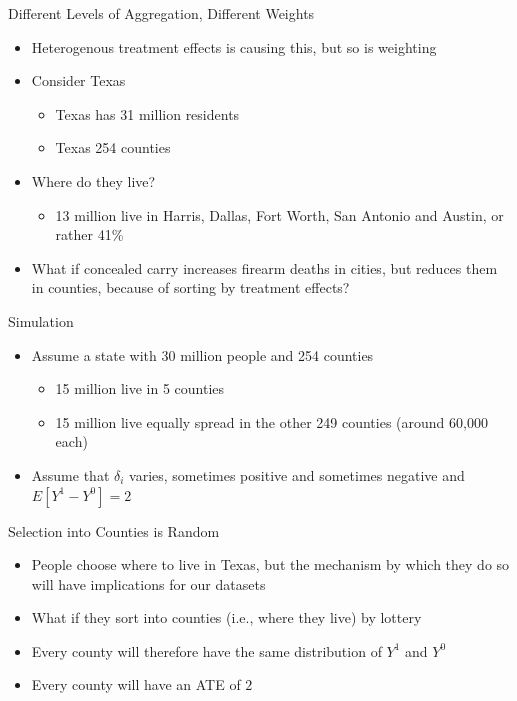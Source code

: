 \documentclass{beamer}
\begin{document}
\begin{frame}{Different Levels of Aggregation, Different Weights}


\begin{itemize}
\item Heterogenous treatment effects is causing this, but so is weighting
\item Consider Texas
	\begin{itemize}
	\item Texas has 31 million residents
	\item Texas 254 counties
	\end{itemize}
\item Where do they live?
	\begin{itemize}
	\item 13 million live in Harris, Dallas, Fort Worth, San Antonio and Austin, or rather 41\%
	\end{itemize}
\item What if concealed carry increases firearm deaths in cities, but reduces them in counties, because of sorting by treatment effects?
\end{itemize}

\end{frame}

\begin{frame}{Simulation}

\begin{itemize}
\item Assume a state with 30 million people and 254 counties
	\begin{itemize}
	\item 15 million live in 5 counties
	\item 15 million live equally spread in the other 249 counties (around 60,000 each)
	\end{itemize}
\item Assume that $\delta_i$ varies, sometimes positive and sometimes negative and $E[Y^1 - Y^0] = 2$
\end{itemize}

\end{frame}

\begin{frame}{Selection into Counties is Random}

\begin{itemize}
\item People choose where to live in Texas, but the mechanism by which they do so will have implications for our datasets
\item What if they sort into counties (i.e., where they live) by lottery
\item Every county will therefore have the same distribution of $Y^1$ and $Y^0$
\item Every county will have an ATE of $2$
\end{itemize}

\end{frame}
\end{document}
